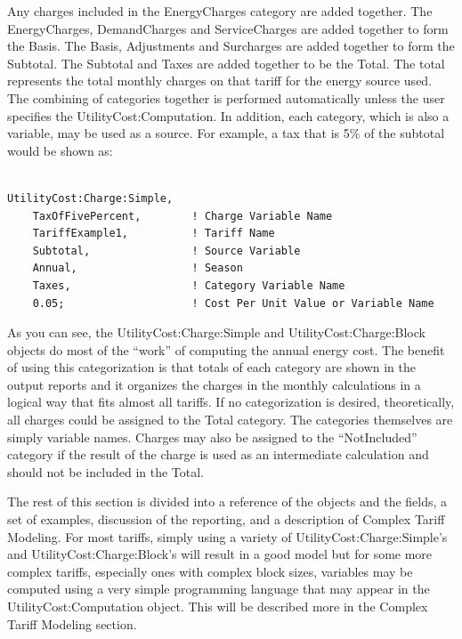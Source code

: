 Any charges included in the EnergyCharges category are added together. The EnergyCharges, DemandCharges and ServiceCharges are added together to form the Basis. The Basis, Adjustments and Surcharges are added together to form the Subtotal. The Subtotal and Taxes are added together to be the Total. The total represents the total monthly charges on that tariff for the energy source used. The combining of categories together is performed automatically unless the user specifies the UtilityCost:Computation. In addition, each category, which is also a variable, may be used as a source. For example, a tax that is 5\% of the subtotal would be shown as:

\begin{lstlisting}

UtilityCost:Charge:Simple,
    TaxOfFivePercent,        ! Charge Variable Name
    TariffExample1,          ! Tariff Name
    Subtotal,                ! Source Variable
    Annual,                  ! Season
    Taxes,                   ! Category Variable Name
    0.05;                    ! Cost Per Unit Value or Variable Name
\end{lstlisting}

As you can see, the UtilityCost:Charge:Simple and UtilityCost:Charge:Block objects do most of the ``work'' of computing the annual energy cost. The benefit of using this categorization is that totals of each category are shown in the output reports and it organizes the charges in the monthly calculations in a logical way that fits almost all tariffs. If no categorization is desired, theoretically, all charges could be assigned to the Total category. The categories themselves are simply variable names. Charges may also be assigned to the ``NotIncluded'' category if the result of the charge is used as an intermediate calculation and should not be included in the Total.

The rest of this section is divided into a reference of the objects and the fields, a set of examples, discussion of the reporting, and a description of Complex Tariff Modeling. For most tariffs, simply using a variety of UtilityCost:Charge:Simple's and UtilityCost:Charge:Block's will result in a good model but for some more complex tariffs, especially ones with complex block sizes, variables may be computed using a very simple programming language that may appear in the UtilityCost:Computation object. This will be described more in the Complex Tariff Modeling section.
